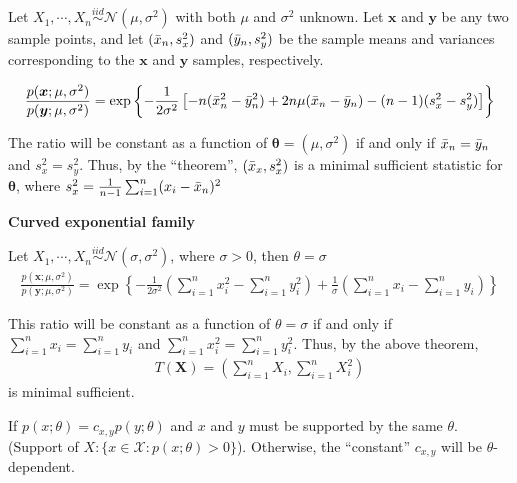 \begin{example}

    Let $X_1,\cdots,X_n\overset{iid}{\sim}\mathcal{N}(\mu,\sigma^2)$ with both $\mu$ and $\sigma^2$ unknown.
    Let $\boldsymbol{x}$ and $\boldsymbol{y}$ be any two sample points, 
    and let $(\Bar{x}_n,s_x^2)$ and $(\Bar{y}_n,s_y^2)$
    be the sample means and variances corresponding to 
    the $\boldsymbol{x}$ and $\boldsymbol{y}$ samples, respectively.

    {\footnotesize
    \begin{gather}
        \frac{p(\boldsymbol{x};\mu,\sigma^2)}{p(\boldsymbol{y};\mu,\sigma^2)}
        = \exp\left\{
        -\frac{1}{2\sigma^2}\left[
        -n(\Bar{x}_n^2-\Bar{y}_n^2)
        +2n\mu(\Bar{x}_n-\Bar{y}_n)
        -(n-1)(s_x^2-s_y^2)
        \right]
        \right\}
    \end{gather}}
    
    The ratio will be constant as a function of $\boldsymbol{\theta}=(\mu,\sigma^2)$
    if and only if $\Bar{x}_n=\Bar{y}_n$ and $s_x^2=s_y^2$. 
    Thus, by the ``theorem'', $(\Bar{x}_x,s_x^2)$ is a minimal sufficient statistic for $\boldsymbol{\theta}$,
    where $s_x^2=\frac{1}{n-1}\sum_{i=1}^n(x_i-\Bar{x}_n)^2$
\end{example}

\begin{example}
    \textbf{Curved exponential family}

    Let $X_1,\cdots,X_n\overset{iid}{\sim}\mathcal{N}(\sigma,\sigma^2)$, where $\sigma>0$, then $\theta=\sigma$
    \begin{gather}
        \frac{p(\boldsymbol{x};\mu,\sigma^2)}{p(\boldsymbol{y};\mu,\sigma^2)}
        = \exp\left\{
        -\frac{1}{2\sigma^2}\left(\sum_{i=1}^n{x_i^2}-\sum_{i=1}^n{y_i^2}\right)
        +\frac{1}{\sigma}\left(\sum_{i=1}^n{x_i}-\sum_{i=1}^n{y_i}\right)
        \right\}
    \end{gather}
    
    This ratio will be constant as a function of $\theta=\sigma$
    if and only if 
    $\sum_{i=1}^n{x_i}=\sum_{i=1}^n{y_i}$ and 
    $\sum_{i=1}^n{x_i^2}=\sum_{i=1}^n{y_i^2}$.
    Thus, by the above theorem, 
    \begin{gather}
        T(\boldsymbol{X})=(\sum_{i=1}^n X_i, \sum_{i=1}^n X_i^2)
    \end{gather}
    is minimal sufficient.
\end{example}

\begin{note}
    If $p(x;\theta)=c_{x,y}p(y;\theta)$ and $x$ and $y$ must be supported by the same $\theta$.
    (Support of $X: \{x\in\mathcal{X}:p(x;\theta)>0\}$).
    Otherwise, the ``constant'' $c_{x,y}$ will be $\theta$-dependent.
\end{note}

